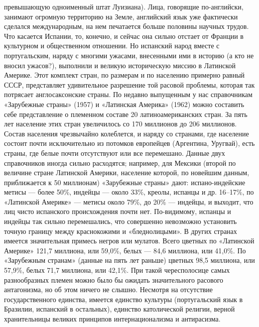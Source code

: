 превышающую одноименный штат  Луизиана). Лица, говорящие по-английски,
занимают огромную территорию на  Земле, английский язык уже фактически
сделался  международным, на  нем  печатается  больше половины  научных
трудов. Что касается Испании, то, конечно, и сейчас она сильно отстает
от Франции в  культурном и общественном отношении.  Но испанский народ
вместе с  португальским, наряду  с многими  ужасами, внесенными  ими в
историю (а  кто не вносил  ужасов?), выполнили и  великую историческую
миссию  в Латинской  Америке. Этот  комплект стран,  по размерам  и по
населению примерно  равный СССР, представляет  удивительное разрешение
той расовой проблемы, которая так потрясает англосаксонские страны. По
недавно  выпущенным у  нас справочникам  «Зарубежные страны»  (1957) и
«Латинская  Америка»  (1962)  можно  составить  себе  представление  о
племенном составе  20 латиноамериканских стран. За  пять лет население
этих  стран увеличилось  со  170 миллионов  до  206 миллионов.  Состав
населения чрезвычайно колеблется, и  наряду со странами, где население
состоит  почти   исключительно  из  потомков   европейцев  (Аргентина,
Уругвай), есть страны, где белые почти отсутствуют или все перемешано.
Данные  двух  справочников  иногда сильно  расходятся;  например,  для
Мексики  (второй  по  величине  стране  Латинской  Америки,  население
которой, по новейшим данным,  приближается к 50 миллионам) «Зарубежные
страны»  дают: испано-индейские  метисы  --- более  50\%, индейцы  ---
около 33\%, креолы, испанцы и др. 16--17\%, по «Латинской Америке» ---
метисы  около 79\%,  до 20\%  --- индейцы,  и выходит,  что лиц  чисто
испанского происхождения почти нет. По-видимому, испанцы и индейцы так
сильно  перемешались,  что  совершенно  невозможно  установить  точную
границу между краснокожими и  «бледнолицыми». В других странах имеется
значительная примесь  негров или мулатов. Всего  цветных по «Латинской
Америке»  121,7 миллиона,  или 59,0\%,  белых ---  84,6 миллиона,  или
41,0\%. По  «Зарубежным странам» (данные  на пять лет  раньше) цветных
98,5  миллиона,  или 57,9\%,  белых  71,7  миллиона, или  42,1\%.  При
такой чересполосице  самых разнообразных племен можно  было бы ожидать
значительного  расового  антагонизма, но  об  этом  ничего не  слышно.
Несмотря  на отсутствие  государственного  единства, имеется  единство
культуры  (португальский  язык  в Бразилии,  испанский  в  остальных),
единство католической религии,  верной хранительницы великих принципов
интернационализма и антирасизма.

